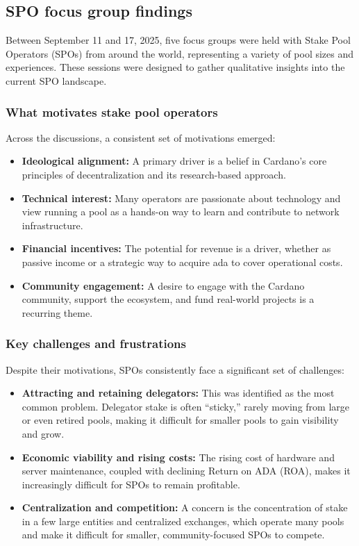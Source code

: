\documentclass[11pt, letterpaper]{article}
\begin{document}
\subsection{SPO focus group findings}

Between September 11 and 17, 2025, five focus groups were held with Stake Pool
Operators (SPOs) from around the world, representing a variety of pool sizes
and experiences. These sessions were designed to gather qualitative insights
into the current SPO landscape.

\subsubsection{What motivates stake pool operators}
Across the discussions, a consistent set of motivations emerged:
\begin{itemize}
	\item \textbf{Ideological alignment:} A primary driver is a belief in Cardano's core principles of
	      decentralization and its research-based approach.
	\item \textbf{Technical interest:} Many operators are passionate about technology and view running a pool
	      as a hands-on way to learn and contribute to network infrastructure.
	\item \textbf{Financial incentives:} The potential for revenue is a driver, whether as passive income or a
	      strategic way to acquire ada to cover operational costs.
	\item \textbf{Community engagement:} A desire to engage with the Cardano community, support the ecosystem,
	      and fund real-world projects is a recurring theme.
\end{itemize}

\subsubsection{Key challenges and frustrations}
Despite their motivations, SPOs consistently face a significant set of
challenges:
\begin{itemize}
	\item \textbf{Attracting and retaining delegators:} This was identified as the most common problem.
	      Delegator stake is often ``sticky,'' rarely moving from large or even retired pools, making it difficult
	      for smaller pools to gain visibility and grow.
	\item \textbf{Economic viability and rising costs:} The rising cost of hardware and server maintenance,
	      coupled with declining Return on ADA (ROA), makes it increasingly difficult for SPOs to remain profitable.
	\item \textbf{Centralization and competition:} A concern is the concentration of stake in a few large
	      entities and centralized exchanges, which operate many pools and make it difficult for smaller,
	      community-focused SPOs to compete.
\end{itemize}
\end{document}
